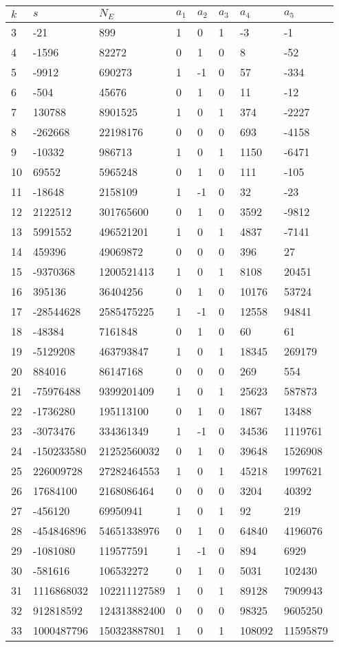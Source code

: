 \documentclass{amsart}
\begin{document}
\begin{longtable}{|l|l|l|lllll|}
\hline
$k$ & $s$ & $N_E$ & $a_1$ & $a_2$ & $a_3$ & $a_4$ & $a_5$\\
\hline
3&-21&899&1&0&1&-3&-1\\
4&-1596&82272&0&1&0&8&-52\\
5&-9912&690273&1&-1&0&57&-334\\
6&-504&45676&0&1&0&11&-12\\
7&130788&8901525&1&0&1&374&-2227\\
8&-262668&22198176&0&0&0&693&-4158\\
9&-10332&986713&1&0&1&1150&-6471\\
10&69552&5965248&0&1&0&111&-105\\
11&-18648&2158109&1&-1&0&32&-23\\
12&2122512&301765600&0&1&0&3592&-9812\\
13&5991552&496521201&1&0&1&4837&-7141\\
14&459396&49069872&0&0&0&396&27\\
15&-9370368&1200521413&1&0&1&8108&20451\\
16&395136&36404256&0&1&0&10176&53724\\
17&-28544628&2585475225&1&-1&0&12558&94841\\
18&-48384&7161848&0&1&0&60&61\\
19&-5129208&463793847&1&0&1&18345&269179\\
20&884016&86147168&0&0&0&269&554\\
21&-75976488&9399201409&1&0&1&25623&587873\\
22&-1736280&195113100&0&1&0&1867&13488\\
23&-3073476&334361349&1&-1&0&34536&1119761\\
24&-150233580&21252560032&0&1&0&39648&1526908\\
25&226009728&27282464553&1&0&1&45218&1997621\\
26&17684100&2168086464&0&0&0&3204&40392\\
27&-456120&69950941&1&0&1&92&219\\
28&-454846896&54651338976&0&1&0&64840&4196076\\
29&-1081080&119577591&1&-1&0&894&6929\\
30&-581616&106532272&0&1&0&5031&102430\\
31&1116868032&102211127589&1&0&1&89128&7909943\\
32&912818592&124313882400&0&0&0&98325&9605250\\
33&1000487796&150323887801&1&0&1&108092&11595879\\

\end{longtable}
\end{document}
